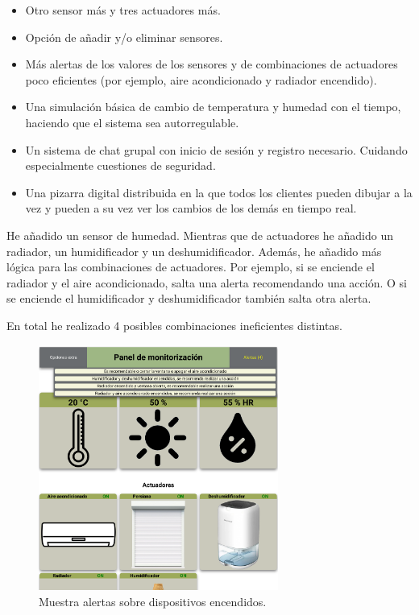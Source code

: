 \documentclass{article}
\begin{document}
\begin{itemize}
    \item Otro sensor más y tres actuadores más.
    \item Opción de añadir y/o eliminar sensores.
    \item Más alertas de los valores de los sensores y de combinaciones de actuadores poco eficientes (por ejemplo, aire acondicionado y radiador encendido).
    \item Una simulación básica de cambio de temperatura y humedad con el tiempo, haciendo que el sistema sea autorregulable.
    \item Un sistema de chat grupal con inicio de sesión y registro necesario. Cuidando especialmente cuestiones de seguridad.
    \item Una pizarra digital distribuida en la que todos los clientes pueden dibujar a la vez y pueden a su vez ver los cambios de los demás en tiempo real.
\end{itemize}

He añadido un sensor de humedad. Mientras que de actuadores he añadido un radiador, un humidificador y un deshumidificador. Además, he añadido más lógica para las combinaciones de actuadores. Por ejemplo, si se enciende el radiador y el aire acondicionado, salta una alerta recomendando una acción. O si se enciende el humidificador y deshumidificador también salta otra alerta.

En total he realizado 4 posibles combinaciones ineficientes distintas.

\begin{figure}[H]
    \centering
    \includegraphics[width=0.7\textwidth]{images/actuadoresmal.png}
    \caption{Muestra alertas sobre dispositivos encendidos.}
\end{figure}
\end{document}
